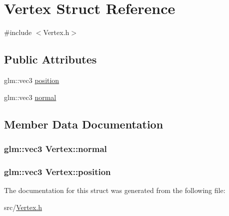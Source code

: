 \hypertarget{struct_vertex}{}\section{Vertex Struct Reference}
\label{struct_vertex}


{\ttfamily \#include $<$Vertex.\+h$>$}

\subsection*{Public Attributes}
\begin{DoxyCompactItemize}
\item 
glm\+::vec3 \hyperlink{struct_vertex_a030819fdc241743bbd3e180a6b132ed3}{position}
\item 
glm\+::vec3 \hyperlink{struct_vertex_a3aa35fe84025ecf1acccb5f65f5577fd}{normal}
\end{DoxyCompactItemize}


\subsection{Member Data Documentation}
\subsubsection[{\texorpdfstring{normal}{normal}}]{\setlength{\rightskip}{0pt plus 5cm}glm\+::vec3 Vertex\+::normal}\hypertarget{struct_vertex_a3aa35fe84025ecf1acccb5f65f5577fd}{}\label{struct_vertex_a3aa35fe84025ecf1acccb5f65f5577fd}
\subsubsection[{\texorpdfstring{position}{position}}]{\setlength{\rightskip}{0pt plus 5cm}glm\+::vec3 Vertex\+::position}\hypertarget{struct_vertex_a030819fdc241743bbd3e180a6b132ed3}{}\label{struct_vertex_a030819fdc241743bbd3e180a6b132ed3}


The documentation for this struct was generated from the following file\+:\begin{DoxyCompactItemize}
\item 
src/\hyperlink{_vertex_8h}{Vertex.\+h}\end{DoxyCompactItemize}
